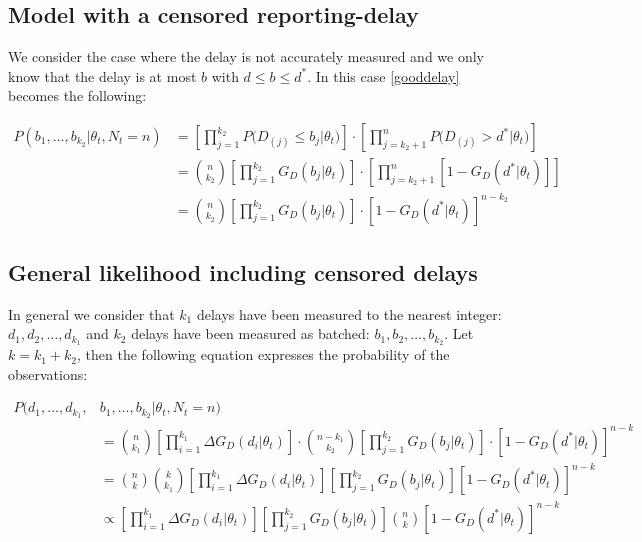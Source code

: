 \documentclass{article}
\begin{document}
\subsection{Model with a censored reporting-delay}\label{sec:batch}
We consider the case where the delay is not accurately measured and we only know that the delay is at most $b$ with $d \leq b \leq d^{*}$. In this case \eqref{gooddelay} becomes the following:

\begin{equation}\label{batcheddelay}
    \begin{aligned}
    P(b_1, \dots, b_{k_2} |\theta_t, N_t = n)  &= \left[ \prod\limits_{j=1}^{k_2} P\big( D_{(j)} \leq b_j|\theta_t\big)\right] \cdot \left[ \prod\limits_{j=k_2+1}^n P\big(D_{(j)} > d^{*}|\theta_t\big)\right] \\
    & = \binom{n}{k_2}\left[ \prod\limits_{j=1}^{k_2} G_D(b_j|\theta_t) \right] \cdot \left[ \prod\limits_{j=k_2+1}^n \left[1 - G_D(d^*|\theta_t)\right]\right] 
    \\ & = \binom{n}{k_2}\left[ \prod\limits_{j=1}^{k_2} G_D(b_j|\theta_t)\right] \cdot  \left[1 - G_D(d^*|\theta_t)\right]^{n-{k_2}}
    \end{aligned}
\end{equation}

\subsection{General likelihood including censored delays}

In general we consider that $k_1$ delays have been measured to the nearest integer: $d_1, d_2, \dots, d_{k_1}$ and $k_2$ delays have been measured as batched: $b_1, b_2, \dots, b_{k_2}$. Let $k = k_1 + k_2$, then the following equation expresses the probability of the observations:

\begin{equation}\label{batchedexact}
    \begin{aligned}
    P(d_1, \dots, d_{k_1}, & b_1, \dots, b_{k_2} |\theta_t, N_t = n)  
    \\ & = \binom{n}{k_1} \left[ \prod\limits_{i=1}^{k_1} \Delta G_D(d_i|\theta_t) \right] \cdot \binom{n - k_1}{k_2} \left[ \prod\limits_{j=1}^{k_2} G_D(b_j|\theta_t) \right] \cdot  \left[ 1 - G_D(d^*|\theta_t)\right]^{n-k}   
    \\ & = \binom{n}{k} \binom{k}{k_1} \left[ \prod\limits_{i=1}^{k_1} \Delta G_D(d_i|\theta_t) \right] \left[ \prod\limits_{j=1}^{k_2} G_D(b_j|\theta_t) \right] \left[ 1 - G_D(d^*|\theta_t)\right]^{n-k}
    \\ & \propto  \left[ \prod\limits_{i=1}^{k_1} \Delta G_D(d_i|\theta_t) \right] \left[ \prod\limits_{j=1}^{k_2} G_D(b_j|\theta_t) \right]\binom{n}{k} \left[ 1 - G_D(d^*|\theta_t)\right]^{n-k}
    \end{aligned}
\end{equation}
\end{document}
